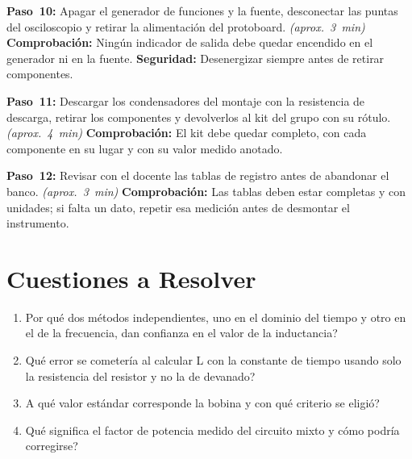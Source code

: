 \documentclass[12pt]{article}
\begin{document}
\begin{pasos}
  \item \textbf{Paso~10:} Apagar el generador de funciones y la fuente, desconectar las puntas del osciloscopio y retirar la alimentación del protoboard. \emph{(aprox.~\SI{3}{\minute})} \textbf{Comprobación:} Ningún indicador de salida debe quedar encendido en el generador ni en la fuente. \textbf{Seguridad:} Desenergizar siempre antes de retirar componentes.
  \item \textbf{Paso~11:} Descargar los condensadores del montaje con la resistencia de descarga, retirar los componentes y devolverlos al kit del grupo con su rótulo. \emph{(aprox.~\SI{4}{\minute})} \textbf{Comprobación:} El kit debe quedar completo, con cada componente en su lugar y con su valor medido anotado.
  \item \textbf{Paso~12:} Revisar con el docente las tablas de registro antes de abandonar el banco. \emph{(aprox.~\SI{3}{\minute})} \textbf{Comprobación:} Las tablas deben estar completas y con unidades; si falta un dato, repetir esa medición antes de desmontar el instrumento.
\end{pasos}

\section{Cuestiones a Resolver}\label{sec:cuestiones}
\begin{enumerate}
  \item \textquestiondown{}Por qué dos métodos independientes, uno en el dominio del tiempo y otro en el de la frecuencia, dan confianza en el valor de la inductancia?
  \item \textquestiondown{}Qué error se cometería al calcular L con la constante de tiempo usando solo la resistencia del resistor y no la de devanado?
  \item \textquestiondown{}A qué valor estándar corresponde la bobina y con qué criterio se eligió?
  \item \textquestiondown{}Qué significa el factor de potencia medido del circuito mixto y cómo podría corregirse?
\end{enumerate}

\end{document}
